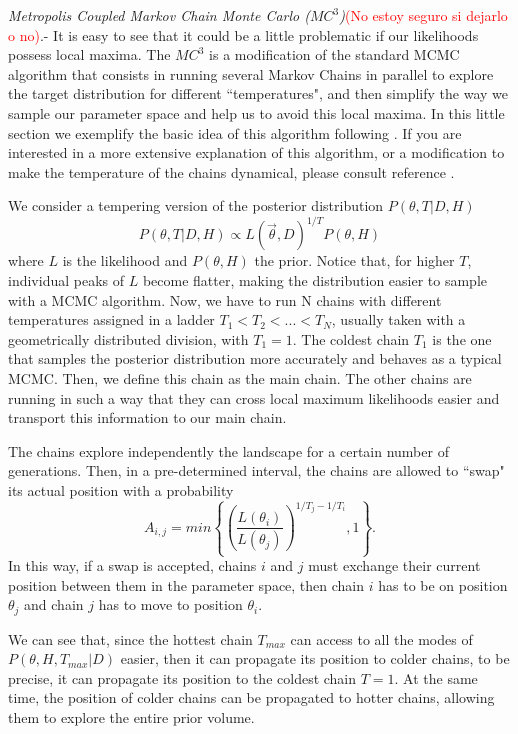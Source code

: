 \documentclass[onecolumn,           %
               showpacs,            %
               preprintnumbers,     %
               aps,                 %
               letterpaper,             %
               superscriptaddress,      %
               nofootinbib,         %
               tightenlines,        %
               floats,floatfix      %
               ,usenatbib,
               ]{revtex4-1}
\begin{document}
\textit{Metropolis Coupled Markov Chain Monte Carlo ($MC^3$)}\textcolor{red}{(No estoy seguro si dejarlo o no)}.- It is easy to see that it could be a little problematic if our likelihoods possess local maxima. The $MC^3$ is a modification of the standard MCMC algorithm that consists in running several Markov Chains in parallel to explore the target distribution for different  ``temperatures", and then simplify the way we sample our parameter space and help us to avoid this local maxima. In this little section we exemplify the basic idea of this algorithm following \cite{mcmcmc}. If you are interested in a more extensive explanation of this algorithm, or a modification to make the temperature of the chains dynamical, please consult reference \cite{mcmcmc}.

We consider a tempering version of the posterior distribution $P(\theta,T|D,H)$
\begin{equation}
P(\theta,T|D,H) \propto L(\vec\theta,D)^{1/T}P(\theta,H)
\end{equation}
where $L$ is the likelihood and $P(\theta,H)$ the prior. Notice that, for higher $T$, individual peaks of $L$ become flatter, making the distribution easier to sample with a MCMC algorithm. Now, we have to run N chains with different temperatures assigned in a ladder $T_1<T_2<...<T_N$, usually taken with a geometrically distributed division, with $T_1=1$. The coldest chain $T_1$ is the one that samples the posterior distribution more accurately and behaves as a typical MCMC. Then, we define this chain as the main chain. The other chains are running in such a way that they can cross local maximum likelihoods easier and transport this information to our main chain.  

The chains explore independently the landscape for a certain number of generations. Then, in a pre-determined interval, the chains are allowed to ``swap" its actual position with a probability
\begin{equation}
A_{i,j}=min\left\lbrace\left(\frac{L(\theta_i)}{L(\theta_j)}\right)^{1/T_j-1/T_i},1\right\rbrace .
\end{equation}
In this way, if a swap is accepted, chains $i$ and $j$ must exchange their current position between them in the parameter space, then chain $i$ has to be on position $\theta_j$ and chain $j$ has to move to position $\theta_i$. 

We can see that, since the hottest chain $T_{max}$ can access to all the modes of $P(\theta,H,T_{max}|D)$ easier, then it can propagate its position to colder chains, to be precise, it can propagate its position to the coldest chain $T=1$. At the same time, the position of colder chains can be propagated to hotter chains, allowing them to explore the entire prior volume.   
\\
\end{document}
